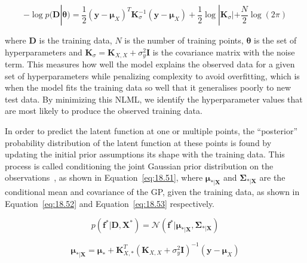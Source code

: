 \documentclass[12pt]{article}
\begin{document}
    \begin{equation}
        -\log p(\mathbf{D}|\boldsymbol{\theta}) = \frac{1}{2} (\mathbf{y} - \boldsymbol{\mu}_X)^T \mathbf{K}_{\sigma}^{-1} (\mathbf{y} - \boldsymbol{\mu}_X) + \frac{1}{2} \log |\mathbf{K}_{\sigma}| + \frac{N}{2} \log(2\pi)\label{eq:NLML}
    \end{equation}


    \noindent where $\mathbf{D}$ is the training data, $N$ is the number of training points, $\boldsymbol{\theta}$ is the set of hyperparameters and $\mathbf{K}_{\sigma} = \mathbf{K}_{X,X} + \sigma^2_y \mathbf{I}$ is the covariance matrix with the noise term.
    This measures how well the model explains the observed data for a given set of hyperparameters while penalizing complexity to avoid overfitting, which is when the model fits the training data so well that it generalises poorly to new test data.
    By minimizing this NLML, we identify the hyperparameter values that are most likely to produce the observed training data.

    In order to predict the latent function at one or multiple points, the ``posterior'' probability distribution of the latent function at these points is found by updating the initial prior assumptions its shape with the training data.
    This process is called conditioning the joint Gaussian prior distribution on the observations~\cite{rasmussen2006gaussian}, as shown in Equation~\ref{eq:18.51}, where $\boldsymbol{\mu}_{*\vert \mathbf{X}}$ and $\boldsymbol{\Sigma}_{*\vert \mathbf{X}}$ are the conditional mean and covariance of the GP, given the training data, as shown in Equation~\ref{eq:18.52} and Equation~\ref{eq:18.53} respectively.

    \begin{equation}
        p(\mathbf{f}^* \vert \mathbf{D}, \mathbf{X}^*) = \mathcal{N}(\mathbf{f}^* \vert \boldsymbol{\mu}_{*\vert \mathbf{X}}, \boldsymbol{\Sigma}_{*\vert \mathbf{X}})\label{eq:18.51}
    \end{equation}

    \begin{equation}
        \boldsymbol{\mu}_{*\vert \mathbf{X}} = \boldsymbol{\mu}_* + \mathbf{K}_{X,*}^T (\mathbf{K}_{X,X} + \sigma^2_y \mathbf{I})^{-1} (\mathbf{y} - \boldsymbol{\mu}_X)\label{eq:18.52}
    \end{equation}
\end{document}
